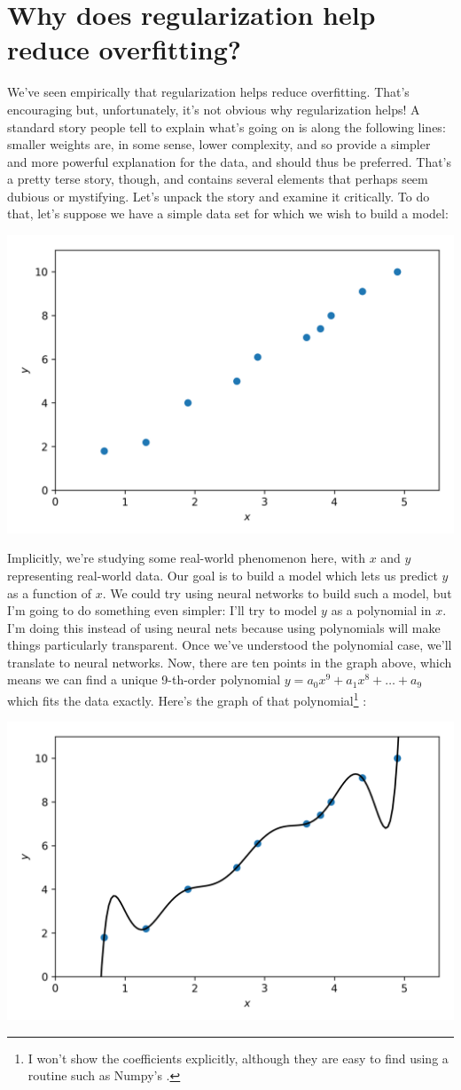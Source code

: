 \documentclass[a4paper,twoside,10pt]{book}
\begin{document}
\section{Why does regularization help reduce overfitting?}
We've seen empirically that regularization helps reduce overfitting. That's encouraging but, unfortunately, it's not obvious why regularization helps! A standard story people tell to explain what's going on is along the following lines: smaller weights are, in some sense, lower complexity, and so provide a simpler and more powerful explanation for the data, and should thus be preferred. That's a pretty terse story, though, and contains several elements that perhaps seem dubious or mystifying. Let's unpack the story and examine it critically. To do that, let's suppose we have a simple data set for which we wish to build a model:
\begin{center}
	\includegraphics[width=0.7\linewidth]{figures/ch3/animation_overfitting1}
\end{center}
Implicitly, we're studying some real-world phenomenon here, with $x$ and $y$ representing real-world data. Our goal is to build a model which lets us predict $y$ as a function of $x$. We could try using neural networks to build such a model, but I'm going to do something even simpler: I'll try to model $y$ as a polynomial in $x$. I'm doing this instead of using neural nets because using polynomials will make things particularly transparent. Once we've understood the polynomial case, we'll translate to neural networks. Now, there are ten points in the graph above, which means we can find a unique 9-th-order polynomial $y=a_0x^9+a_1x^8+\ldots+a_9$ which fits the data exactly. Here's the graph of that polynomial\footnote{I won't show the coefficients explicitly, although they are easy to find using a routine such as Numpy's .} :
\begin{center}
	\includegraphics[width=0.7\linewidth]{figures/ch3/animation_overfitting2}
	\end{center}
\end{document}
